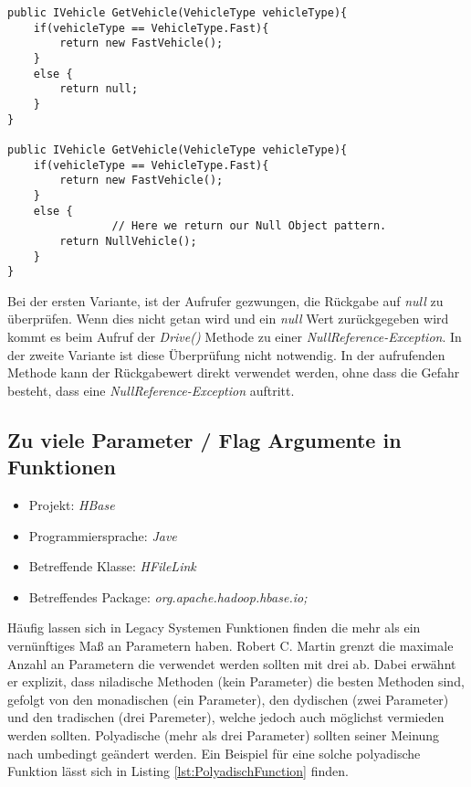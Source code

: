 \begin{lstlisting}[language={[Sharp]C}, caption=Anwendung des Null Object pattern, label=lst:UsageNullObjectPattern]
public IVehicle GetVehicle(VehicleType vehicleType){
    if(vehicleType == VehicleType.Fast){
        return new FastVehicle();
    }
    else {
        return null; 
    }
}

public IVehicle GetVehicle(VehicleType vehicleType){
    if(vehicleType == VehicleType.Fast){
        return new FastVehicle();
    }
    else {
				// Here we return our Null Object pattern.
        return NullVehicle();
    }
}
\end{lstlisting}

\SuperPar Bei der ersten Variante, ist der Aufrufer gezwungen, die Rückgabe auf \textit{null} zu überprüfen. Wenn dies nicht getan wird und ein \textit{null} Wert zurückgegeben wird kommt es beim Aufruf der \textit{Drive()} Methode zu einer \textit{NullReference-Exception}. In der zweite Variante ist diese Überprüfung nicht notwendig. In der aufrufenden Methode kann der Rückgabewert direkt verwendet werden, ohne dass die Gefahr besteht, dass eine \textit{NullReference-Exception} auftritt.

\subsection{Zu viele Parameter / Flag Argumente in Funktionen}
\begin{itemize}
	\item Projekt: \textit{HBase}
	\item Programmiersprache: \textit{Jave}
	\item Betreffende Klasse: \textit{HFileLink}
	\item Betreffendes Package: \textit{org.apache.hadoop.hbase.io;}
\end{itemize}

\SuperPar Häufig lassen sich in Legacy Systemen Funktionen finden die mehr als ein vernünftiges Maß an Parametern haben. Robert C. Martin grenzt die maximale Anzahl an Parametern die verwendet werden sollten mit drei ab. Dabei erwähnt er explizit, dass niladische Methoden (kein Parameter) die besten Methoden sind, gefolgt von den monadischen (ein Parameter), den dydischen (zwei Parameter) und den tradischen (drei Paremeter), welche jedoch auch möglichst vermieden werden sollten. Polyadische (mehr als drei Parameter) sollten seiner Meinung nach umbedingt geändert werden. Ein Beispiel für eine solche polyadische Funktion lässt sich in Listing
 \ref{lst:PolyadischFunction} finden.

